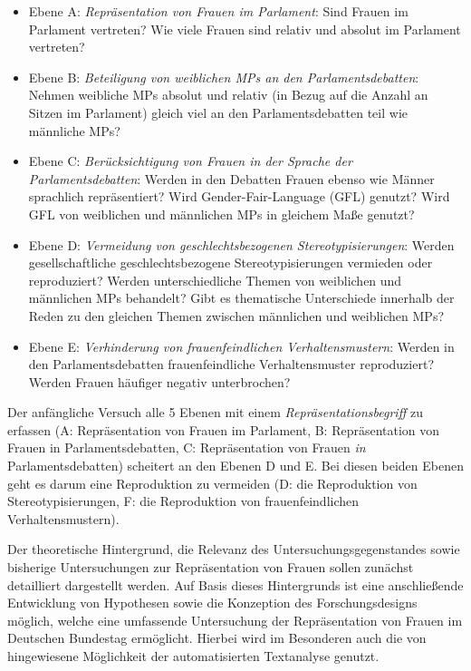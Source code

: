 \documentclass[12pt, 
    twoside=false, 
    bibliography=totoc, 
    numbers=endperiod, 
    headings=normal, 
    toc=chapterentrydotfill
    ]{scrbook}
\begin{document}
\begin{itemize}
    \item Ebene A: \emph{Repräsentation von Frauen im Parlament}: Sind Frauen im Parlament vertreten? Wie viele Frauen sind relativ und absolut im Parlament vertreten? 
    \item Ebene B: \emph{Beteiligung von weiblichen MPs an den Parlamentsdebatten}: Nehmen weibliche MPs absolut und relativ (in Bezug auf die Anzahl an Sitzen im Parlament) gleich viel an den Parlamentsdebatten teil wie männliche MPs? 
    \item Ebene C: \emph{Berücksichtigung von Frauen in der Sprache der Parlamentsdebatten}: Werden in den Debatten Frauen ebenso wie Männer sprachlich repräsentiert? Wird Gender-Fair-Language (GFL) genutzt? Wird GFL von weiblichen und männlichen MPs in gleichem Maße genutzt? 
    \item Ebene D: \emph{Vermeidung von geschlechtsbezogenen Stereotypisierungen}: Werden gesellschaftliche geschlechtsbezogene Stereotypisierungen vermieden oder reproduziert? Werden unterschiedliche Themen von weiblichen und männlichen MPs behandelt? Gibt es thematische Unterschiede innerhalb der Reden zu den gleichen Themen zwischen männlichen und weiblichen MPs? 
    \item Ebene E: \emph{Verhinderung von frauenfeindlichen Verhaltensmustern}: Werden in den Parlamentsdebatten frauenfeindliche Verhaltensmuster reproduziert? Werden Frauen häufiger negativ unterbrochen? 
    \end{itemize}

Der anfängliche Versuch alle 5 Ebenen mit einem \emph{Repräsentationsbegriff} zu erfassen (A: Repräsentation von Frauen im Parlament, B: Repräsentation von Frauen in Parlamentsdebatten, C: Repräsentation von Frauen \emph{in} Parlamentsdebatten) scheitert an den Ebenen D und E. Bei diesen beiden Ebenen geht es darum eine Reproduktion zu vermeiden (D: die Reproduktion von Stereotypisierungen, F: die Reproduktion von frauenfeindlichen Verhaltensmustern). 

Der theoretische Hintergrund, die Relevanz des Untersuchungsgegenstandes sowie bisherige Untersuchungen zur Repräsentation von Frauen sollen zunächst detailliert dargestellt werden. Auf Basis dieses Hintergrunds ist eine anschließende Entwicklung von Hypothesen sowie die Konzeption des Forschungsdesigns möglich, welche eine umfassende Untersuchung der Repräsentation von Frauen im Deutschen Bundestag ermöglicht. Hierbei wird im Besonderen auch die von \textcite[18]{back_2018} hingewiesene Möglichkeit der automatisierten Textanalyse genutzt.
\end{document}
